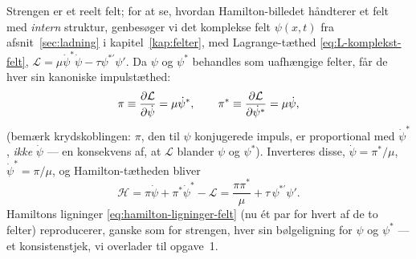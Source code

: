 \begin{eksempel}
Strengen er et reelt felt; for at se, hvordan Hamilton-billedet
håndterer et felt med \emph{intern} struktur, genbesøger vi det
komplekse felt $\psi(x,t)$ fra
afsnit~\ref{sec:ladning} i kapitel~\ref{kap:felter}, med
Lagrange-tæthed \eqref{eq:L-komplekst-felt},
$\mathcal{L}=\mu\dot\psi^\ast\dot\psi-\tau\psi^{\ast\prime}\psi'$.
Da $\psi$ og $\psi^\ast$ behandles som uafhængige felter, får de hver
sin kanoniske impulstæthed:
\begin{equation}
  \pi \equiv \pdv{\mathcal{L}}{\dot\psi} = \mu\dot\psi^\ast, \qquad
  \pi^\ast \equiv \pdv{\mathcal{L}}{\dot\psi^\ast} = \mu\dot\psi,
\end{equation}
(bemærk krydskoblingen: $\pi$, den til $\psi$ konjugerede impuls, er
proportional med $\dot\psi^\ast$, \emph{ikke} $\dot\psi$ — en
konsekvens af, at $\mathcal{L}$ blander $\psi$ og $\psi^\ast$).
Inverteres disse, $\dot\psi=\pi^\ast/\mu$, $\dot\psi^\ast=\pi/\mu$, og
Hamilton-tætheden bliver
\begin{equation}
  \mathcal{H} = \pi\dot\psi + \pi^\ast\dot\psi^\ast - \mathcal{L}
  = \frac{\pi\pi^\ast}{\mu} + \tau\,\psi^{\ast\prime}\psi'.
\end{equation}
Hamiltons ligninger \eqref{eq:hamilton-ligninger-felt} (nu ét par for
hvert af de to felter) reproducerer, ganske som for strengen, hver sin
bølgeligning for $\psi$ og $\psi^\ast$ — et konsistenstjek, vi
overlader til opgave~1.


\end{eksempel}
